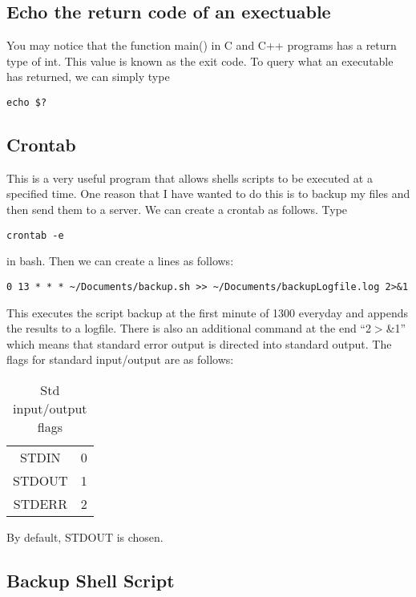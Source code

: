 \documentclass[a4paper, 10pt]{article}
\begin{document}
\subsection{Echo the return code of an exectuable}
You may notice that the function main() in C and C++ programs has a return type of int. This value is known as the exit code. To query what an executable has returned, we can simply type
\begin{verbatim}
echo $?
\end{verbatim}

\subsection*{Crontab}

This is a very useful program that allows shells scripts to be executed at a specified time. One reason that I have wanted to do this is to backup my files and then send them to a server. We can create a crontab as follows. Type
\begin{Verbatim}
crontab -e
\end{Verbatim}
in bash. Then we can create a lines as follows:
\begin{Verbatim}
0 13 * * * ~/Documents/backup.sh >> ~/Documents/backupLogfile.log 2>&1
\end{Verbatim}
This executes the script backup at the first minute of 1300 everyday and appends the results to a logfile. There is also an additional command at the end ``2$>$\&1'' which means that standard error output is directed into standard output. The flags for standard input/output are as follows:
\begin{table}[htp]
\caption{Std input/output flags}
\begin{center}
\begin{tabular}{|c|c|}
\hline
STDIN & 0\\
STDOUT & 1\\
STDERR & 2\\
\hline
\end{tabular}
\end{center}
\label{default}
\end{table}%
By default, STDOUT is chosen.


\subsection*{Backup Shell Script}
\end{document}
